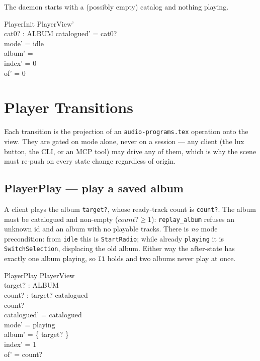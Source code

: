 \documentclass[a4paper,10pt,fleqn]{article}
\begin{document}
The daemon starts with a (possibly empty) catalog and nothing playing.

\begin{schema}{PlayerInit}
  PlayerView' \\
  cat0? : \power ALBUM
  \where
  catalogued' = cat0? \\
  mode' = idle \\
  album' = \emptyset \\
  index' = 0 \\
  of' = 0
\end{schema}

\section{Player Transitions}

Each transition is the projection of an \texttt{audio-programs.tex} operation
onto the view. They are gated on mode alone, never on a session --- any client
(the lux button, the CLI, or an MCP tool) may drive any of them, which is why the
scene must re-push on every state change regardless of origin.

\subsection{PlayerPlay --- play a saved album}

A client plays the album \texttt{target?}, whose ready-track count is
\texttt{count?}. The album must be catalogued and non-empty ($count? \geq 1$):
\texttt{replay\_album} refuses an unknown id and an album with no playable
tracks. There is \emph{no} mode precondition: from \texttt{idle} this is
\texttt{StartRadio}; while already \texttt{playing} it is
\texttt{SwitchSelection}, displacing the old album. Either way the after-state
has exactly one album playing, so \texttt{I1} holds and two albums never play at
once.

\begin{schema}{PlayerPlay}
  \Delta PlayerView \\
  target? : ALBUM \\
  count? : \nat
  \where
  target? \in catalogued \\
  count?  \\
  catalogued' = catalogued \\
  mode' = playing \\
  album' = \{ target? \} \\
  index' = 1 \\
  of' = count?
\end{schema}
\end{document}
